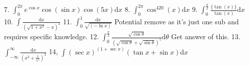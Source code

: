 \documentclass{article}
\newcommand{\dd}{\mathrm{d}}
\begin{document}
\begin{flushleft}
7. $\int_0^{2\pi} e^{\cos{x}}\cos(\sin{x})\cos(5x) \dd x$ \newline  \newline \newline 
8. $\int_0^{2\pi} \cos^{420}(x) \dd x$ \newline  \newline \newline 
9. $\int_0^{\frac{\pi}{2}} \frac{\{\tan(x)\}}{\tan(x)} \dd x$ \newline  \newline \newline 
10. $\int \frac{\dd x}{(\sqrt{1+x^2}-x)^2}$ \newline  \newline \newline 
11. $\int_0^1 \frac{\dd x}{\sqrt{(-\ln{x})}}$ Potential remove as it's just one sub and requires specific knowledge. \newline  \newline \newline 
12. $\int_0^{\frac{\pi}{2}} \frac{\sqrt{\cos{\theta}}}{(\sqrt{\cos{\theta}}+\sqrt{\sin{\theta}})^5} \dd \theta$ Get answer of this.  \newline  \newline \newline 
13. $\int_{-\infty}^{\infty} \frac{\dd x}{\left(x^3+\frac{1}{x^3}\right)^2}$ \newline  \newline \newline 
14, $\int (\sec{x})^{(1+\sec{x})}(\tan{x}+\sin{x}) \dd x$ \newline  \newline \newline 

\end{flushleft}
\end{document}
